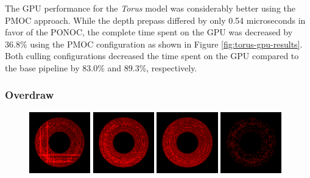 \noindent
The \ac{GPU} performance for the \emph{Torus} model was considerably better using the \ac{PMOC} approach. 
While the depth prepass differed by only 0.54 microseconds in favor of the \ac{PONOC}, the complete time 
spent on the \ac{GPU} was decreased by $36.8\%$ using the \ac{PMOC} configuration as shown in Figure 
\ref{fig:torus-gpu-results}. \\

\noindent
Both culling configurations decreased the time spent on the \ac{GPU} compared to the base pipeline by 
$83.0\%$ and $89.3\%$, respectively.

\subsubsection*{Overdraw}

\begin{figure}[!htbp]
  \centering
  \includegraphics[height=100px]{images/graphics/overdraw-torus1-nocull.png}
  \includegraphics[height=100px]{images/graphics/overdraw-torus1-pooc.png}
  \includegraphics[height=100px]{images/graphics/overdraw-torus1-pmoc.png}
  \includegraphics[height=100px]{images/graphics/overdraw-torus1-diff.png}


\end{figure}
